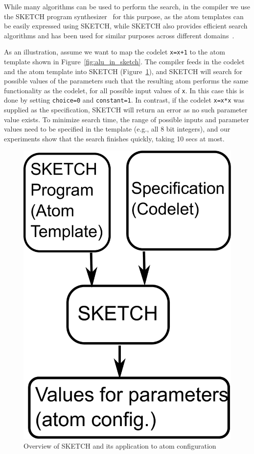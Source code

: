 While many algorithms can be used to perform the search, in the \pktlanguage
compiler we use the SKETCH program synthesizer~\cite{sketch_asplos} for this
purpose, as the atom templates can be easily expressed using SKETCH, while
SKETCH also provides efficient search algorithms and has been used for similar
purposes across different domains~\cite{bitstreaming, lifejoin, qbs, chlorophyll}.

As an illustration, assume we want to map the codelet {\tt x=x+1} to the atom
template shown in Figure~\ref{fig:alu_in_sketch}. The \pktlanguage compiler
feeds in the codelet and the atom template into SKETCH
(Figure~\ref{fig:sketch}), and SKETCH will search for possible values of the
parameters such that the resulting atom performs the same functionality as the
codelet, for all possible input values of {\tt x}.  In this case this is done
by setting {\tt choice=0} and {\tt constant=1}.  In contrast, if the codelet
{\tt x=x*x} was supplied as the specification, SKETCH will return an error as
no such parameter value exists. To minimize search time, the range of possible
inputs and parameter values need to be specified in the template (e.g., all 8
bit integers), and our experiments show that the search finishes quickly,
taking 10 secs at most.

\begin{figure}[!b]
  \begin{center}
  \includegraphics[width=0.4\columnwidth]{sketch.pdf}
  \caption{Overview of SKETCH and its application to atom configuration}
  \label{fig:sketch}
  \end{center}
\end{figure}

